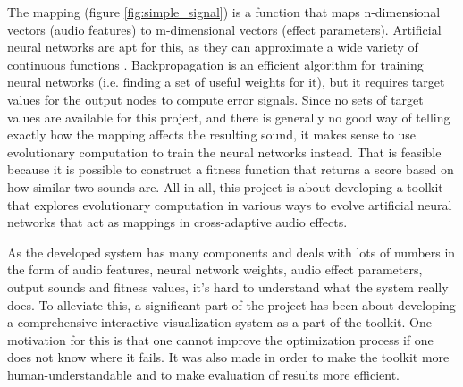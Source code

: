 The mapping (figure \ref{fig:simple_signal}) is a function that maps n-dimensional vectors (audio features) to m-dimensional vectors (effect parameters). Artificial neural networks are apt for this, as they can approximate a wide variety of continuous functions \citep{hornik1991}. Backpropagation \citep{werbos1982, lecun1998} is an efficient algorithm for training neural networks (i.e. finding a set of useful weights for it), but it requires target values for the output nodes to compute error signals. Since no sets of target values are available for this project, and there is generally no good way of telling exactly how the mapping affects the resulting sound, it makes sense to use evolutionary computation to train the neural networks instead. That is feasible because it is possible to construct a fitness function that returns a score based on how similar two sounds are. All in all, this project is about developing a toolkit that explores evolutionary computation in various ways to evolve artificial neural networks that act as mappings in cross-adaptive audio effects.

As the developed system has many components and deals with lots of numbers in the form of audio features, neural network weights, audio effect parameters, output sounds and fitness values, it’s hard to understand what the system really does. To alleviate this, a significant part of the project has been about developing a comprehensive interactive visualization system as a part of the toolkit. One motivation for this is that one cannot improve the optimization process if one does not know where it fails. It was also made in order to make the toolkit more human-understandable and to make evaluation of results more efficient.
